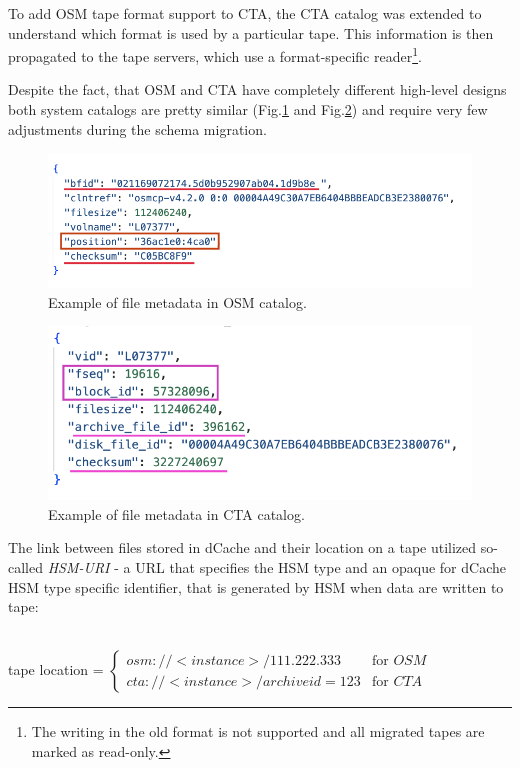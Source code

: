 \documentclass{webofc}
\begin{document}
To add OSM tape format support to CTA, the CTA catalog was extended to understand 
which format is used by a particular tape. This information is then propagated to the tape servers, which use a format-specific reader\footnote{The writing in the old format is not supported and all migrated tapes are marked as read-only.}.

Despite the fact, that OSM and CTA have completely different high-level designs both system catalogs are pretty similar (Fig.\ref{fig:osm_entry_example} and Fig.\ref{fig:cta_entry_example}) and require very few adjustments during the schema migration.

\begin{figure}[h]
    \centering
    \includegraphics[scale=0.60]{osm-schema.png}
    \caption{Example of file metadata in OSM catalog.}
    \label{fig:osm_entry_example}
\end{figure}

\begin{figure}[h]
    \centering
    \includegraphics[scale=0.60]{cta-schema.png}
    \caption{Example of file metadata in CTA catalog.}
    \label{fig:cta_entry_example}
\end{figure}

The link between files stored in dCache and their location on a tape utilized so-called \textit{HSM-URI} - a URL that specifies the HSM type and an opaque for dCache HSM type specific identifier, that is generated by HSM when data are written to tape:

~\\
tape location = $\begin{cases}
    osm://<instance>/111.222.333 &\text{for } OSM \\
    cta://<instance>/archiveid=123 &\text{for } CTA
\end{cases}$
~\\
\end{document}
